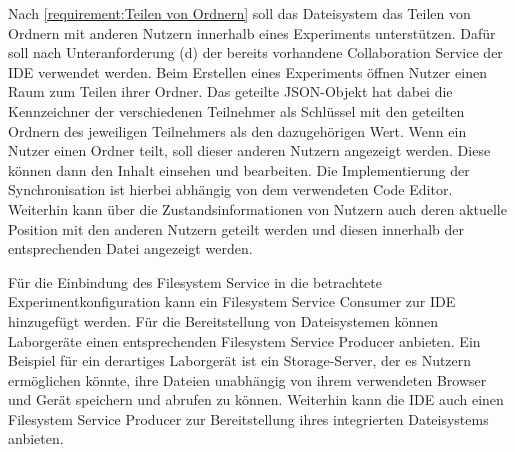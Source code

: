 Nach \autoref{requirement:Teilen von Ordnern} soll das Dateisystem das Teilen von Ordnern mit anderen Nutzern innerhalb eines Experiments unterstützen. Dafür soll nach Unteranforderung (d) der bereits vorhandene Collaboration Service der IDE verwendet werden. Beim Erstellen eines Experiments öffnen Nutzer einen Raum zum Teilen ihrer Ordner. Das geteilte JSON-Objekt hat dabei die Kennzeichner der verschiedenen Teilnehmer als Schlüssel mit den geteilten Ordnern des jeweiligen Teilnehmers als den dazugehörigen Wert. Wenn ein Nutzer einen Ordner teilt, soll dieser anderen Nutzern angezeigt werden. Diese können dann den Inhalt einsehen und bearbeiten. Die Implementierung der Synchronisation ist hierbei abhängig von dem verwendeten Code Editor. Weiterhin kann über die Zustandsinformationen von Nutzern auch deren aktuelle Position mit den anderen Nutzern geteilt werden und diesen innerhalb der entsprechenden Datei angezeigt werden.

Für die Einbindung des Filesystem Service in die betrachtete Experimentkonfiguration kann ein Filesystem Service Consumer zur IDE hinzugefügt werden. Für die Bereitstellung von Dateisystemen können Laborgeräte einen entsprechenden Filesystem Service Producer anbieten. Ein Beispiel für ein derartiges Laborgerät ist ein Storage-Server, der es Nutzern ermöglichen könnte, ihre Dateien unabhängig von ihrem verwendeten Browser und Gerät speichern und abrufen zu können. Weiterhin kann die IDE auch einen Filesystem Service Producer zur Bereitstellung ihres integrierten Dateisystems anbieten.